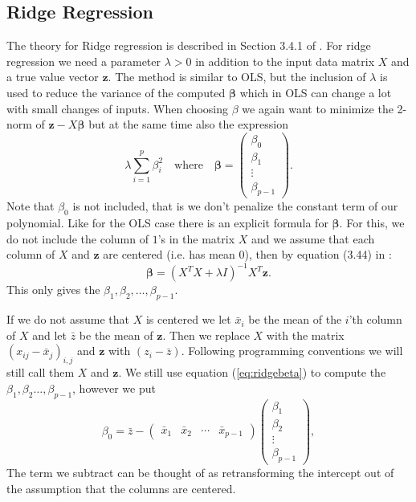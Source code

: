 \documentclass[parskip=half]{scrartcl}
\theoremstyle{definition}
\theoremstyle{remark}
\newcommand{\vect}[1]{{\bm{#1}}}
\begin{document}
\subsection{Ridge Regression}  

The theory for Ridge regression is described in Section 3.4.1 of \cite{htf:esl}. 
For ridge regression we need a parameter $\lambda > 0$ in addition to the input data matrix $X$ and a true value vector $\vect{z}$.
The method is similar to OLS, but the inclusion of $\lambda$ is used to reduce the variance of the computed $\vect{\beta}$ which in OLS can change a lot with small changes of inputs.    
When choosing $\beta$ we again want to minimize the 2-norm of $\vect{z} - X\vect{\beta}$ but at the same time also the expression 
\[
	\lambda \sum_{i=1}^p \beta_i^2 \quad \text{where} \quad  \vect{\beta} = \begin{pmatrix}\beta_0 \\ \beta_1 \\ \vdots \\ \beta_{p-1} \end{pmatrix}.	     
\]
Note that $\beta_0$ is not included, that is we don't penalize the constant term of our polynomial. 
Like for the OLS case there is an explicit formula for $\vect{\beta}$.
For this, we do not include the column of $1$'s in the matrix $X$ and we assume that each column of $X$ and $\vect{z}$ are centered (i.e. has mean $0$), then by equation (3.44) in \cite{htf:esl}:
\begin{equation} \label{eq:ridgebeta}
	\vect{\beta} = \left(X^T X + \lambda I \right)^{-1} X^T \vect{z}. 
\end{equation}
This only gives the $\beta_1, \beta_2, \ldots, \beta_{p-1}$. 

If we do not assume that $X$ is centered we let $\bar{x}_i$ be the mean of the $i$'th column of $X$ and let $\bar{z}$ be the mean of $\vect{z}$.
Then we replace $X$ with the matrix $(x_{ij} - \bar{x}_j)_{i,j}$ and $\vect{z}$ with $(z_i - \bar{z})$. 
Following programming conventions we will still call them $X$ and $\vect{z}$.
We still use equation (\ref{eq:ridgebeta}) to compute the $\beta_1, \beta_2 \ldots, \beta_{p-1}$, however we put
\begin{equation} \label{eq:ridgeintercept}
	\beta_0 = \bar{z} - \begin{pmatrix} \bar{x}_1 & \bar{x}_2 & \cdots & \bar{x}_{p-1} \end{pmatrix} \begin{pmatrix} \beta_1 \\ \beta_2 \\ \vdots \\ \beta_{p-1} \end{pmatrix},
\end{equation}
The term we subtract can be thought of as retransforming the intercept out of the assumption that the columns are centered. 
\end{document}

